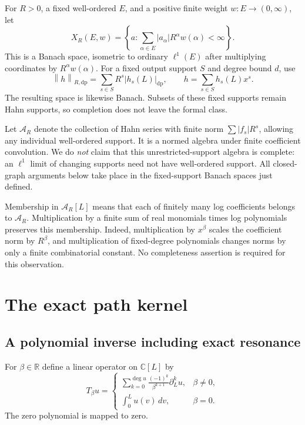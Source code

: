 \documentclass[11pt,a4paper]{article}
\numberwithin{equation}{section}
\theoremstyle{definition}
\theoremstyle{remark}
\newcommand{\R}{\mathbb R}
\newcommand{\C}{\mathbb C}
\newcommand{\A}{\mathcal A}
\newcommand{\norm}[1]{\left\|#1\right\|}
\begin{document}
For $R>0$, a fixed well-ordered $E$, and a positive finite weight
$w:E\to(0,\infty)$, let
\begin{equation}\label{eq:inputnorm}
 X_R(E,w)=\left\{a:\sum_{\alpha\in E}|a_\alpha|R^\alpha
                                      w(\alpha)<\infty\right\}.
\end{equation}
This is a Banach space, isometric to ordinary $\ell^1(E)$ after multiplying
coordinates by $R^\alpha w(\alpha)$. For a fixed output support $S$ and
degree bound $d$, use
\begin{equation}\label{eq:outputnorm}
 \norm{h}_{R,\mathrm{dp}}
   =\sum_{s\in S}R^s|h_s(L)|_{\mathrm{dp}},\qquad
 h=\sum_{s\in S}h_s(L)x^s.
\end{equation}
The resulting space is likewise Banach. Subsets of these fixed supports
remain Hahn supports, so completion does not leave the formal class.

Let $\A_R$ denote the collection of Hahn series with finite norm
$\sum |f_s|R^s$, allowing any individual well-ordered support. It is a
normed algebra under finite coefficient convolution. We do \emph{not}
claim that this unrestricted-support algebra is complete: an $\ell^1$
limit of changing supports need not have well-ordered support. All
closed-graph arguments below take place in the fixed-support Banach spaces
just defined.

Membership in $\A_R[L]$ means that each of finitely many log coefficients
belongs to $\A_R$. Multiplication by a finite sum of real monomials times
log polynomials preserves this membership. Indeed, multiplication by
$x^\beta$ scales the coefficient norm by $R^\beta$, and multiplication of
fixed-degree polynomials changes norms by only a finite combinatorial
constant. No completeness assertion is required for this observation.

\section{The exact path kernel}
\label{sec:kernel}

\subsection{A polynomial inverse including exact resonance}
For $\beta\in\R$ define a linear operator on $\C[L]$ by
\begin{equation}\label{eq:T}
 T_\beta u=
 \begin{cases}
 \displaystyle\sum_{k=0}^{\deg u}
          \frac{(-1)^k}{\beta^{k+1}}\partial_L^k u,&\beta\ne0,\\[6pt]
 \displaystyle\int_0^L u(v)\,dv,&\beta=0.
 \end{cases}
\end{equation}
The zero polynomial is mapped to zero.
\end{document}
